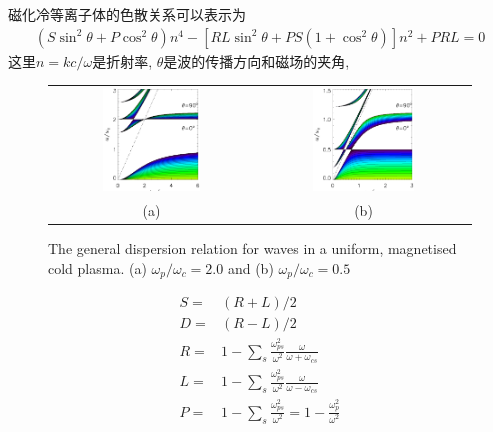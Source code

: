 \documentclass[landscape]{article}
\begin{document}
	磁化冷等离子体的色散关系可以表示为\citep{Diver2001}
	\begin{align}
		\left(S \sin^2 \theta + P \cos^2 \theta\right) n^4 - \left[R L \sin^2 \theta
		+ P S \left(1 + \cos^2 \theta\right) \right] n^2 + P R L= 0 \label{Eqn:Colp}
	\end{align}
	这里$n = k c / \omega$是折射率, $\theta$是波的传播方向和磁场的夹角,
	\begin{figure}[htb]
		\begin{tabular}{cc}
			\includegraphics[width=0.5\textwidth]{figure2_1.eps} &
			\includegraphics[width=0.5\textwidth]{figure2_2.eps}
			\\
			(a) & (b)
		\end{tabular}
		\caption{The general dispersion relation for waves in a uniform, magnetised cold
			plasma. (a) $\omega_p / \omega_c = 2.0$ and (b) $\omega_p / \omega_c = 0.5$} \label{ColdPlasma}
	\end{figure}
	\begin{align*}
		S =& (R + L) / 2
		\\
		D =& (R - L) / 2
		\\
		R =& 1 - \sum_s \frac{\omega_{ps}^2}{\omega^2} \frac{\omega}{\omega + \omega_{cs}}
		\\
		L =& 1 - \sum_s \frac{\omega_{ps}^2}{\omega^2} \frac{\omega}{\omega - \omega_{cs}}
		\\
		P =& 1 - \sum_s \frac{\omega_{ps}^2}{\omega^2}  = 1 - \frac{\omega_p^2}{\omega^2}
	\end{align*}
\end{document}
